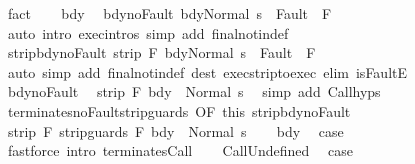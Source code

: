 \begin{isabellebody}
\ fact\isanewline
\ \ \isamarkupfalse%
\ bdy\ \isamarkupfalse%
\ bdy{\isacharunderscore}noFault{\isacharcolon}\ {\isachardoublequoteopen}{\isasymGamma}{\isasymturnstile}{\isasymlangle}bdy{\isacharcomma}Normal\ s\ {\isasymrangle}\ {\isasymRightarrow}{\isasymnotin}Fault\ {\isacharbackquote}\ F{\isachardoublequoteclose}\isanewline
\ \ \ \ \isamarkupfalse%
\ {\isacharparenleft}auto\ intro{\isacharcolon}\ exec{\isachardot}intros\ simp\ add{\isacharcolon}\ final{\isacharunderscore}notin{\isacharunderscore}def{\isacharparenright}\isanewline
\ \ \isamarkupfalse%
\ \isamarkupfalse%
\ strip{\isacharunderscore}bdy{\isacharunderscore}noFault{\isacharcolon}\ {\isachardoublequoteopen}strip\ F\ {\isasymGamma}{\isasymturnstile}{\isasymlangle}bdy{\isacharcomma}Normal\ s\ {\isasymrangle}\ {\isasymRightarrow}{\isasymnotin}Fault\ {\isacharbackquote}\ F{\isachardoublequoteclose}\isanewline
\ \ \ \ \isamarkupfalse%
\ {\isacharparenleft}auto\ simp\ add{\isacharcolon}\ final{\isacharunderscore}notin{\isacharunderscore}def\ dest{\isacharbang}{\isacharcolon}\ exec{\isacharunderscore}strip{\isacharunderscore}to{\isacharunderscore}exec\ elim{\isacharbang}{\isacharcolon}\ isFaultE{\isacharparenright}\isanewline
\isanewline
\ \ \isamarkupfalse%
\ bdy{\isacharunderscore}noFault\ \isamarkupfalse%
\ {\isachardoublequoteopen}strip\ F\ {\isasymGamma}{\isasymturnstile}bdy\ {\isasymdown}\ Normal\ s{\isachardoublequoteclose}\ \isamarkupfalse%
\ {\isacharparenleft}simp\ add{\isacharcolon}\ Call{\isachardot}hyps{\isacharparenright}\isanewline
\ \ \isamarkupfalse%
\ terminates{\isacharunderscore}noFault{\isacharunderscore}strip{\isacharunderscore}guards\ {\isacharbrackleft}OF\ this\ strip{\isacharunderscore}bdy{\isacharunderscore}noFault{\isacharbrackright}\isanewline
\ \ \isamarkupfalse%
\ {\isachardoublequoteopen}strip\ F\ {\isasymGamma}{\isasymturnstile}strip{\isacharunderscore}guards\ F\ bdy\ {\isasymdown}\ Normal\ s{\isachardoublequoteclose}\isacommand{{\isachardot}}\isamarkupfalse%
\isanewline
\ \ \isamarkupfalse%
\ bdy\ \isamarkupfalse%
\ {\isacharquery}case\isanewline
\ \ \ \ \isamarkupfalse%
\ {\isacharparenleft}fastforce\ intro{\isacharcolon}\ terminates{\isachardot}Call{\isacharparenright}\isanewline
{}\isamarkupfalse%
\isanewline
\ \ \isamarkupfalse%
\ CallUndefined\ \isamarkupfalse%
\ {\isacharquery}case\ \isamarkupfalse%

\end{isabellebody}
